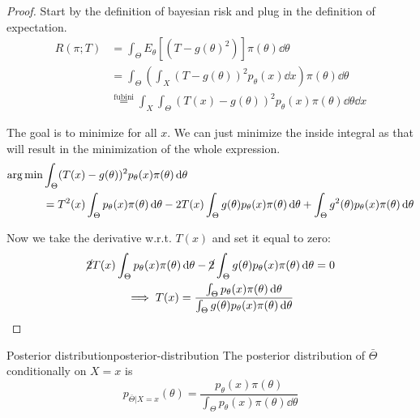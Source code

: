 \documentclass[12pt]{extarticle}
\begin{document}
\begin{proof}
    Start by the definition of bayesian risk and plug in the definition of expectation.
    \begin{align}
        R(\pi; T) & = \int_\Theta E_\theta[(T-g(\theta)^2)] \pi(\theta) \dd{\theta}                                               \\
                  & = \int_\Theta \left(\int_X (T-g(\theta))^2 p_\theta(x)\dd{x} \right) \pi(\theta) \dd{\theta}                  \\
                  & \stackrel{\text{fubini}}{=} \int_X \int_\Theta (T(x) - g(\theta))^2 p_\theta(x) \pi(\theta) \dd{\theta}\dd{x}
    \end{align}

    The goal is to minimize for all $x$. We can just minimize the inside integral as that will result in the minimization of the whole expression.
    \begin{align}
        \operatorname*{arg\,min} & \int_\Theta (T(x) - g(\theta))^2 p_\theta(x) \pi(\theta) \dd{\theta}                                                                                                                    \\
                & = T^2(x) \int_\Theta p_\theta(x) \pi(\theta) \dd{\theta}- 2T(x) \int_\Theta g(\theta) p_\theta(x) \pi(\theta) \dd{\theta} + \int_\Theta g^2(\theta) p_\theta(x) \pi(\theta) \dd{\theta}
    \end{align}

    Now we take the derivative w.r.t. $T(x)$ and set it equal to zero:
    \begin{gather}
        \cancel 2 T(x) \int_\Theta p_\theta(x) \pi(\theta) \dd{\theta}- \cancel 2 \int_\Theta g(\theta) p_\theta(x) \pi(\theta) \dd{\theta} = 0 \\
        \implies T(x) = \frac{\int_\Theta p_\theta(x) \pi(\theta) \dd{\theta}}{\int_\Theta g(\theta) p_\theta(x) \pi(\theta) \dd{\theta}}
    \end{gather}
\end{proof}

\begin{definition}{Posterior distribution}{posterior-distribution}
    The posterior distribution of $\bar \Theta$ conditionally on $X = x$ is
    \begin{equation}
        p_{\bar \Theta | X = x} (\theta) = \frac{p_\theta(x) \pi(\theta)}{\int_\Theta p_\theta(x) \pi(\theta) \dd{\theta}}
    \end{equation}
\end{definition}
\end{document}
